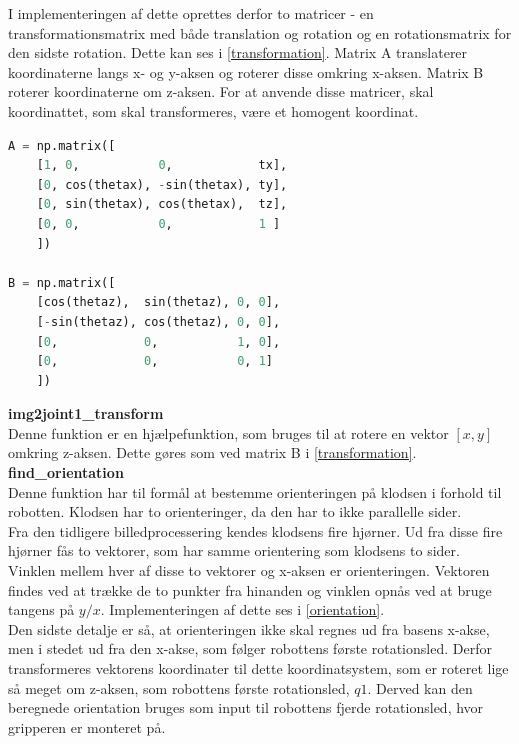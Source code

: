I implementeringen af dette oprettes derfor to matricer - en transformationsmatrix med både translation og rotation og en rotationsmatrix for den sidste rotation. Dette kan ses i \autoref{transformation}. Matrix A translaterer koordinaterne langs x- og y-aksen og roterer disse omkring x-aksen. Matrix B roterer koordinaterne om z-aksen. For at anvende disse matricer, skal koordinattet, som skal transformeres, være et homogent koordinat.

\begin{lstlisting}[caption=Matricer til transformation., label=transformation, language=Python]
A = np.matrix([
    [1, 0,           0,            tx],
    [0, cos(thetax), -sin(thetax), ty],
    [0, sin(thetax), cos(thetax),  tz],
    [0, 0,           0,            1 ]
    ])

B = np.matrix([
    [cos(thetaz),  sin(thetaz), 0, 0],
    [-sin(thetaz), cos(thetaz), 0, 0],
    [0,            0,           1, 0],
    [0,            0,           0, 1]
    ])
\end{lstlisting}


\textbf{img2joint1\_transform} \\
Denne funktion er en hjælpefunktion, som bruges til at rotere en vektor $[x,y]$ omkring z-aksen. Dette gøres som ved matrix B i \autoref{transformation}. \\


\textbf{find\_orientation} \\
Denne funktion har til formål at bestemme orienteringen på klodsen i forhold til robotten. Klodsen har to orienteringer, da den har to ikke parallelle sider. \\

Fra den tidligere billedprocessering kendes klodsens fire hjørner. Ud fra disse fire hjørner fås to vektorer, som har samme orientering som klodsens to sider. Vinklen mellem hver af disse to vektorer og x-aksen er orienteringen. Vektoren findes ved at trække de to punkter fra hinanden og vinklen opnås ved at bruge tangens på $y/x$. Implementeringen af dette ses i \autoref{orientation}. \\

Den sidste detalje er så, at orienteringen ikke skal regnes ud fra basens x-akse, men i stedet ud fra den x-akse, som følger robottens første rotationsled. Derfor transformeres vektorens koordinater til dette koordinatsystem, som er roteret lige så meget om z-aksen, som robottens første rotationsled, $q1$. Derved kan den beregnede orientation bruges som input til robottens fjerde rotationsled, hvor gripperen er monteret på. \\

